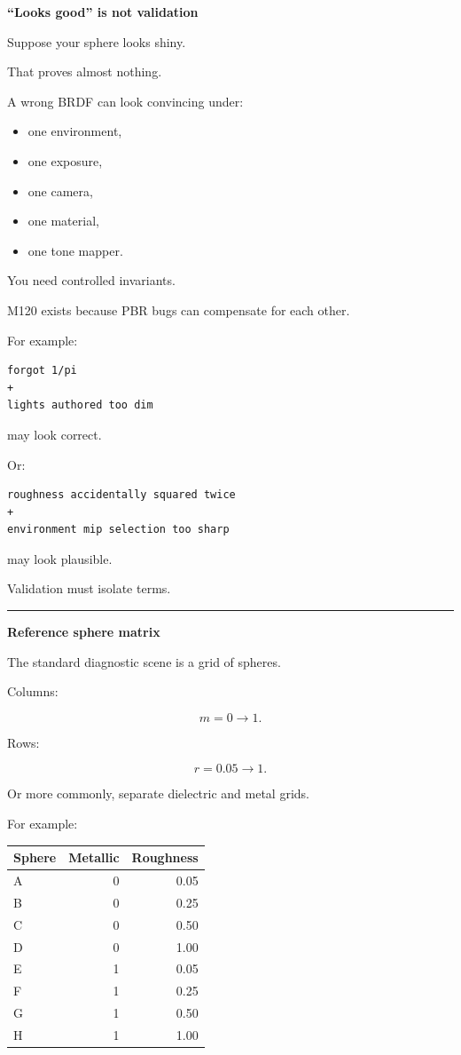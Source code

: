 \textbf{``Looks good'' is not validation}

Suppose your sphere looks shiny.

That proves almost nothing.

A wrong BRDF can look convincing under:

\begin{itemize}
\tightlist
\item
  one environment,
\item
  one exposure,
\item
  one camera,
\item
  one material,
\item
  one tone mapper.
\end{itemize}

You need controlled invariants.

M120 exists because PBR bugs can compensate for each other.

For example:

\begin{verbatim}
forgot 1/pi
+
lights authored too dim
\end{verbatim}

may look correct.

Or:

\begin{verbatim}
roughness accidentally squared twice
+
environment mip selection too sharp
\end{verbatim}

may look plausible.

Validation must isolate terms.

\begin{center}\rule{0.5\linewidth}{0.5pt}\end{center}

\textbf{Reference sphere matrix}

The standard diagnostic scene is a grid of spheres.

Columns:

\[
m=0\rightarrow1.
\]

Rows:

\[
r=0.05\rightarrow1.
\]

Or more commonly, separate dielectric and metal grids.

For example:

{\def\LTcaptype{none} %
\begin{longtable}[]{@{}lrr@{}}
\toprule\noalign{}
Sphere & Metallic & Roughness \\
\midrule\noalign{}
\endhead
\bottomrule\noalign{}
\endlastfoot
A & 0 & 0.05 \\
B & 0 & 0.25 \\
C & 0 & 0.50 \\
D & 0 & 1.00 \\
E & 1 & 0.05 \\
F & 1 & 0.25 \\
G & 1 & 0.50 \\
H & 1 & 1.00 \\
\end{longtable}
}

